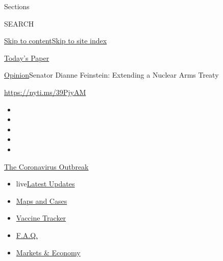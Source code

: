 Sections

SEARCH

\protect\hyperlink{site-content}{Skip to
content}\protect\hyperlink{site-index}{Skip to site index}

\href{https://myaccount.nytimes.com/auth/login?response_type=cookie\&client_id=vi}{}

\href{https://www.nytimes.com/section/todayspaper}{Today's Paper}

\href{/section/opinion}{Opinion}\textbar{}Senator Dianne Feinstein:
Extending a Nuclear Arms Treaty

\href{https://nyti.ms/39PjyAM}{https://nyti.ms/39PjyAM}

\begin{itemize}
\item
\item
\item
\item
\item
\end{itemize}

\href{https://www.nytimes.com/news-event/coronavirus?action=click\&pgtype=Article\&state=default\&region=TOP_BANNER\&context=storylines_menu}{The
Coronavirus Outbreak}

\begin{itemize}
\tightlist
\item
  live\href{https://www.nytimes.com/2020/08/08/world/coronavirus-updates.html?action=click\&pgtype=Article\&state=default\&region=TOP_BANNER\&context=storylines_menu}{Latest
  Updates}
\item
  \href{https://www.nytimes.com/interactive/2020/us/coronavirus-us-cases.html?action=click\&pgtype=Article\&state=default\&region=TOP_BANNER\&context=storylines_menu}{Maps
  and Cases}
\item
  \href{https://www.nytimes.com/interactive/2020/science/coronavirus-vaccine-tracker.html?action=click\&pgtype=Article\&state=default\&region=TOP_BANNER\&context=storylines_menu}{Vaccine
  Tracker}
\item
  \href{https://www.nytimes.com/interactive/2020/world/coronavirus-tips-advice.html?action=click\&pgtype=Article\&state=default\&region=TOP_BANNER\&context=storylines_menu}{F.A.Q.}
\item
  \href{https://www.nytimes.com/live/2020/08/07/business/stock-market-today-coronavirus?action=click\&pgtype=Article\&state=default\&region=TOP_BANNER\&context=storylines_menu}{Markets
  \& Economy}
\end{itemize}

